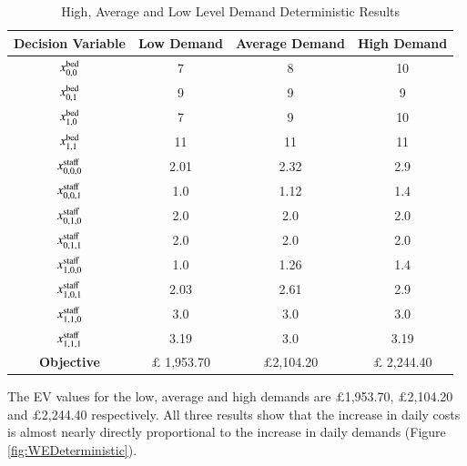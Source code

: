 \documentclass[../thesis.tex]{subfiles}
\begin{document}
{\begin{table}[h!]
    \centering
    \begin{tabular}{cccc}\toprule
    \textbf{Decision Variable}     &\textbf{Low Demand} &\textbf{Average Demand} & \textbf{High Demand}  \\\midrule
     $x^\textnormal{bed}_{0,0}$        & 7  & 8 &  10\\
     $x^\textnormal{bed}_{0,1}$        & 9  & 9 &  9\\
     $x^\textnormal{bed}_{1,0}$        & 7  & 9 & 10\\
     $x^\textnormal{bed}_{1,1}$        & 11 & 11 &  11\\ \midrule
     $x^\textnormal{staff}_{0,0,0}$    & 2.01 &2.32& 2.9 \\
     $x^\textnormal{staff}_{0,0,1}$    & 1.0 &1.12& 1.4\\
     $x^\textnormal{staff}_{0,1,0}$    & 2.0 & 2.0& 2.0\\
     $x^\textnormal{staff}_{0,1,1}$    & 2.0 &2.0& 2.0\\
     $x^\textnormal{staff}_{1,0,0}$    & 1.0 &1.26& 1.4\\
     $x^\textnormal{staff}_{1,0,1}$    & 2.03 &2.61& 2.9\\
     $x^\textnormal{staff}_{1,1,0}$    & 3.0 &3.0& 3.0\\
     $x^\textnormal{staff}_{1,1,1}$    & 3.19 &3.0& 3.19\\ \midrule
     \textbf{Objective} &$\pounds$ 1,953.70 & $\pounds$2,104.20& $\pounds$ 2,244.40\\\bottomrule
    \end{tabular}
    \caption{High, Average and Low Level Demand Deterministic Results}
    \label{tab:WEDeterministicResults}
\end{table}

The EV values for the low, average and high demands are $\pounds$1,953.70, $\pounds$2,104.20 and $\pounds$2,244.40 respectively. All three results show that the increase in daily costs is almost nearly directly proportional to the increase in daily demands (Figure \ref{fig:WEDeterministic}).

}
\end{document}
